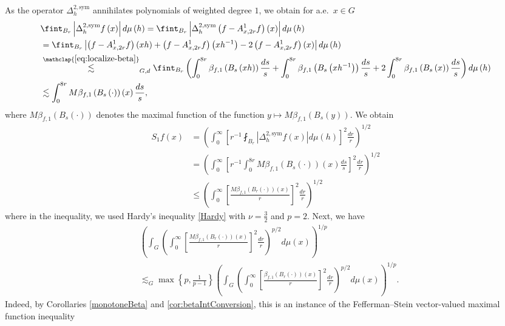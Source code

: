 \documentclass[11pt,reqno]{amsart}
\newcommand{\1}{\mathbf 1}
\begin{document}
As the operator $\Delta_h^{2,\mathrm{sym}}$ annihilates polynomials of weighted degree $1$, we obtain for a.e.~$x\in G$
\begin{align*}
&\fint_{B_r}\left|\Delta_h^{2,\mathrm{sym}}f\left(x\right)\right|d\mu\left(h\right)=\fint_{B_r}\left|\Delta_h^{2,\mathrm{sym}}\left(f-A_{x,2r}^1f\right)\left(x\right)\right|d\mu\left(h\right)\\
&=\fint_{B_r}\left|\left(f-A_{x,2r}^1f\right)\left(xh\right)+\left(f-A_{x,2r}^1f\right)\left(xh^{-1}\right)-2\left(f-A_{x,2r}^1f\right)\left(x\right)\right|d\mu\left(h\right)\\
&\stackrel{\mathclap{\eqref{eq:localize-beta}}}{\lesssim}_{G,d}\fint_{B_r}\left(\int_0^{8r}\beta_{f,1}\left(B_s\left(xh\right)\right)\frac{ds}{s}+\int_0^{8r}\beta_{f,1}\left(B_s\left(xh^{-1}\right)\right)\frac{ds}{s}+2\int_0^{8r}\beta_{f,1}\left(B_s\left(x\right)\right)\frac{ds}{s}\right)d\mu\left(h\right)\\
&\lesssim \int_0^{8r}M\beta_{f,1}\left(B_s\left(\cdot\right)\right)\left(x\right)\frac{ds}{s},
\end{align*}
where $M\beta_{f,1}\left(B_s\left(\cdot\right)\right)$ denotes the maximal function of the function $y\mapsto M\beta_{f,1}\left(B_s\left(y\right)\right)$.
We obtain
\begin{align*}
S_1 f\left(x\right)&=\left(\int_0^\infty \left[r^{-1}\fint _{B_r}\left|\Delta_h^{2,\mathrm{sym}}f\left(x\right)\right|d\mu\left(h\right)\right]^2\frac{dr}{r}\right)^{1/2}\\
&=\left(\int_0^\infty \left[r^{-1}\int_0^{8r}M\beta_{f,1}\left(B_s\left(\cdot\right)\right)\left(x\right)\frac{ds}{s}\right]^2\frac{dr}{r}\right)^{1/2}\\
&\le \left(\int_0^\infty \left[\frac{M\beta_{f,1}\left(B_r\left(\cdot\right)\right)\left(x\right)}r\right]^2\frac{dr}{r}\right)^{1/2}
\end{align*}
where in the inequality, we used Hardy's inequality \eqref{Hardy} with $\nu=\frac 32$ and $p=2$.
Next, we have
\begin{align*}
&\left(\int_G\left(\int_0^\infty \left[\frac{M\beta_{f,1}\left(B_r\left(\cdot\right)\right)\left(x\right)}r\right]^2\frac{dr}{r}\right)^{p/2}d\mu\left(x\right)\right)^{1/p}\\
&\lesssim_G \max\left\{p,\frac{1}{p-1}\right\} \left(\int_G\left(\int_0^\infty \left[\frac{\beta_{f,1}\left(B_r\left(\cdot\right)\right)\left(x\right)}r\right]^2\frac{dr}{r}\right)^{p/2}d\mu\left(x\right)\right)^{1/p}.
\end{align*}
Indeed, by Corollaries \ref{monotoneBeta} and \ref{cor:betaIntConversion}, this is an instance of the Fefferman--Stein vector-valued maximal function inequality
\end{document}
